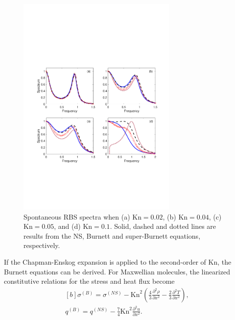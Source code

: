 \begin{figure}
	\centering
	\includegraphics[width=0.7\textwidth]{FluidDynamic/IMG/s_NSBurnett.pdf}
	\caption{Spontaneous RBS spectra when (a) $\text{Kn}=0.02$, (b) $\text{Kn}=0.04$, (c) $\text{Kn}=0.05$, and (d) $\text{Kn}=0.1$. Solid, dashed and dotted lines are results from the NS, Burnett and super-Burnett equations, respectively.  } %
	\label{fig:NSBurnett}
\end{figure}	

If the Chapman-Enskog expansion is applied to the second-order of $\text{Kn}$, the Burnett equations can be derived. For Maxwellian molecules, the linearized constitutive relations for the stress and heat flux become
\begin{equation}
\begin{aligned}[b]
\sigma^{(B)}=\sigma^{(NS)}-\text{Kn}^2\left(\frac{4}{3}\frac{\partial^2 \rho}{\partial x^2}-\frac{2}{3}\frac{\partial^2 {T}}{\partial x^2}\right),\\
q^{(B)}=q^{(NS)}-\frac{7}{4}\text{Kn}^2\frac{\partial^2u}{\partial x^2}.
\end{aligned}
\end{equation}	



